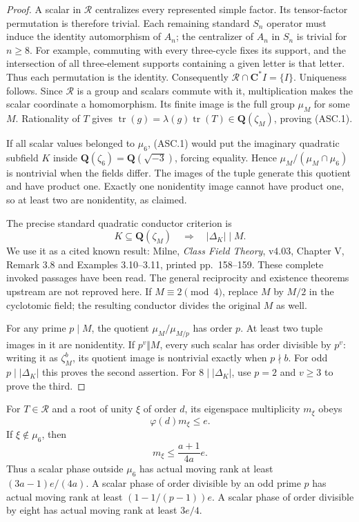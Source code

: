 \begin{proof}
A scalar in $\mathcal R$ centralizes every represented simple factor.
Its tensor-factor permutation is therefore trivial. Each remaining
standard $S_n$ operator must induce the identity automorphism of $A_n$;
the centralizer of $A_n$ in $S_n$ is trivial for $n\ge8$.
For example, commuting with every three-cycle fixes its support, and
the intersection of all three-element supports containing a given
letter is that letter. Thus each permutation is the identity.
Consequently $\mathcal R\cap\mathbf C^*I=\{I\}$.
Uniqueness follows. Since $\mathcal R$ is a group and scalars commute
with it, multiplication makes the scalar coordinate a homomorphism.
Its finite image is the full group $\mu_M$ for some $M$.
Rationality of $T$ gives
$\operatorname{tr}(g)=\lambda(g)\operatorname{tr}(T)
\in\mathbf Q(\zeta_M)$, proving (ASC.1).

If all scalar values belonged to $\mu_6$, (ASC.1) would put the
imaginary quadratic subfield $K$ inside
$\mathbf Q(\zeta_6)=\mathbf Q(\sqrt{-3})$, forcing equality.
Hence $\mu_M/(\mu_M\cap\mu_6)$ is nontrivial when the fields
differ. The images of the tuple generate this quotient and have
product one. Exactly one nonidentity image cannot have product one,
so at least two are nonidentity, as claimed.

The precise standard quadratic conductor criterion is
\[
 K\subseteq\mathbf Q(\zeta_M)\quad\Longrightarrow\quad
                             |\Delta_K|\mid M.
 \tag{ASC.2}
\]
We use it as a cited known result: Milne, \emph{Class Field Theory},
v4.03, Chapter V, Remark 3.8 and Examples 3.10--3.11,
printed pp.~158--159.\cite{HD:MilneCFT2020}
These complete invoked passages have been read. The general reciprocity
and existence theorems upstream are not reproved here. If
$M\equiv2\pmod4$, replace $M$ by $M/2$ in the cyclotomic field;
the resulting conductor divides the original $M$ as well.

For any prime $p\mid M$, the quotient
$\mu_M/\mu_{M/p}$ has order $p$. At least two tuple images
in it are nonidentity. If $p^v\Vert M$, every such scalar has
order divisible by $p^v$: writing it as $\zeta_M^b$, its quotient
image is nontrivial exactly when $p\nmid b$.
For odd $p\mid|\Delta_K|$ this proves the second assertion.
For $8\mid|\Delta_K|$, use $p=2$ and $v\ge3$ to prove the third.
\end{proof}

\begin{lemma}
\label{HD-AST-05}
For $T\in\mathcal R$ and a root of unity $\xi$ of order $d$,
its eigenspace multiplicity $m_\xi$ obeys
\[
             \varphi(d)m_\xi\le e.
 \tag{ASC.3}
\]
If $\xi\notin\mu_6$, then
\[
                         m_\xi\le\frac{a+1}{4a}e.
 \tag{ASC.4}
\]
Thus a scalar phase outside $\mu_6$ has actual moving rank at least
$(3a-1)e/(4a)$. A scalar phase of order divisible by an odd prime
$p$ has actual moving rank at least $(1-1/(p-1))e$.
A scalar phase of order divisible by eight has actual moving rank
at least $3e/4$.
\end{lemma}

